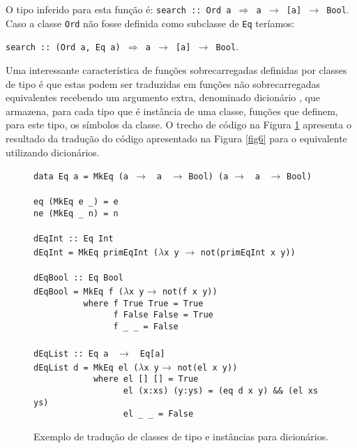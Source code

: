 O tipo inferido para esta fun\c{c}\~ao \'e: \texttt{search :: Ord a $\Rightarrow$ a $\rightarrow$ [a] $\rightarrow$ Bool}. Caso a classe \texttt{Ord} n\~ao fosse definida como subclasse de \texttt{Eq} ter\'iamos:
\begin{center} 
\texttt{search :: (Ord a, Eq a) $\Rightarrow$ a $\rightarrow$ [a] $\rightarrow$ Bool}.
\end{center}

Uma interessante caracter\'istica de fun\c{c}\~oes sobrecarregadas definidas por classes de tipo \'e 
que estas podem ser traduzidas em fun\c{c}\~oes n\~ao sobrecarregadas equivalentes recebendo um 
argumento extra, denominado dicion\'ario \cite{Wadler89}, que armazena, para cada
tipo que \'e inst\^ancia de uma classe, fun\c{c}\~oes que definem, para este tipo, os s\'imbolos da 
classe. O trecho de c\'odigo na Figura \ref{fig8} apresenta o resultado da tradu\c{c}\~ao do c\'odigo 
apresentado na Figura \ref{fig6} para o equivalente utilizando dicion\'arios.

\begin{figure}[h]
     \verb|data Eq a = MkEq (a |$\rightarrow$ \verb| a | $\rightarrow$ \verb|Bool) (a|
     $\rightarrow$ \verb| a | $\rightarrow$ \verb|Bool)|\\\\
     \verb|eq (MkEq e _) = e|\\
     \verb|ne (MkEq _ n) = n|\\\\
     \verb|dEqInt :: Eq Int|\\
   \verb|dEqInt = MkEq primEqInt (|$\lambda$\verb|x y| 
   $\rightarrow$ \verb|not(primEqInt x y))|\\\\
     \verb|dEqBool :: Eq Bool|\\
     \verb|dEqBool = MkEq f (|$\lambda$\verb|x y|$\rightarrow$ \verb|not(f x y))|\\
     \verb|          where f True True = True|\\
     \verb|                f False False = True|\\
     \verb|                f _ _ = False|\\\\
     \verb|dEqList :: Eq a | $\rightarrow$ \verb| Eq[a]|\\
     \verb|dEqList d = MkEq el (|$\lambda$\verb|x y|$\rightarrow$ \verb|not(el x y))|\\ \verb|            where el [] [] = True|\\
     \verb|                  el (x:xs) (y:ys) = (eq d x y) && (el xs ys)|\\
     \verb|                  el _ _ = False|
  \caption{Exemplo de tradu\c{c}\~ao de classes de tipo e inst\^ancias para dicion\'arios.}
  \label{fig8}
\end{figure}

